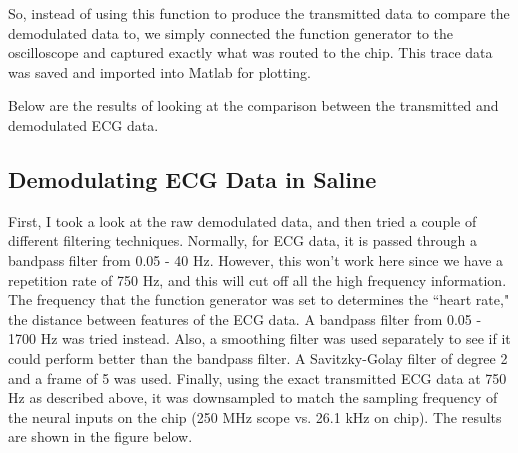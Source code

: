 \documentclass[12pt,onecolumn,titlepage]{article}
\begin{document}
So, instead of using this function to produce the transmitted data to compare the demodulated data to, we simply connected the function generator to the oscilloscope and captured exactly what was routed to the chip. This trace data was saved and imported into Matlab for plotting.

Below are the results of looking at the comparison between the transmitted and demodulated ECG data.

\subsection{Demodulating ECG Data in Saline}
\indent \indent First, I took a look at the raw demodulated data, and then tried a couple of different filtering techniques. Normally, for ECG data, it is passed through a bandpass filter from 0.05 - 40 Hz. However, this won't work here since we have a repetition rate of 750 Hz, and this will cut off all the high frequency information. The frequency that the function generator was set to determines the ``heart rate," the distance between features of the ECG data. A bandpass filter from 0.05 - 1700 Hz was tried instead. Also, a smoothing filter was used separately to see if it could perform better than the bandpass filter. A Savitzky-Golay filter of degree 2 and a frame of 5 was used. Finally, using the exact transmitted ECG data at 750 Hz as described above, it was downsampled to match the sampling frequency of the neural inputs on the chip (250 MHz scope vs. 26.1 kHz on chip). The results are shown in the figure below.
\end{document}
